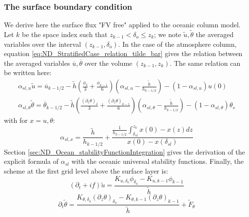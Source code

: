 \subsubsection{The surface boundary condition}
We derive here the surface flux "FV free" applied to the oceanic
column model. Let $k$ be the space index such that
$z_{k-1} < \delta_o \leq z_k$;
we note $\widetilde{u}, \widetilde{\theta}$
the averaged variables over the interval $(z_{k-1}, \delta_o)$.
In the case of the atmosphere column, equation
\eqref{eq:ND_StratifiedCase_relation_tilde_bar}
gives the relation between the averaged variables
$\overline{u}, \overline{\theta}$ over the volume $(z_{k-1}, z_{k})$.
The same relation can be written here:
\begin{equation}
\begin{aligned}
\label{eq:ND_Ocean_relation_tilde_bar}
\alpha_{sl, u}\widetilde{u} = \overline{u}_{k-1/2} -
\widetilde{h}
	\left(\frac{\phi_{\delta}}{3} + \frac{\phi_{k-1}}{6}\right)
	\left(\alpha_{sl, u} - \frac{\widetilde{h}}{h_{k-1/2}}\right)
	- (1 - \alpha_{sl, u})u(0)\\
\alpha_{sl, \theta}
\widetilde{\theta}
= \overline{\theta}_{k-1/2} -
	\widetilde{h}\left(\frac{{(\partial_z \theta)}_{\delta}}{3}
	+ \frac{{(\partial_z \theta)}_{k-1}}{6}\right)
	\left(\alpha_{sl, \theta}-\frac{\widetilde{h}}{h_{k-1/2}}\right)
 - (1 - \alpha_{sl, \theta})\theta_s
\end{aligned}
\end{equation}
with for $x = u, \theta$:
\begin{equation}
	\alpha_{sl, x} = \frac{\widetilde{h}}{h_{k-1/2}} +
	\frac{\frac{1}{{h_{k-1/2}}}\int_{\delta_{sl}}^{z_k} x(0) - x(z)
	dz}{x(0) - x(\delta_{sl})}
\end{equation}
Section \ref{sec:ND_Ocean_stabilityFunctionIntegration}
gives the derivation of the explicit formula of $\alpha_{sl}$
with the oceanic universal stability functions.
Finally, the scheme at the first grid level above
the surface layer is:
\begin{equation}
	\label{eq:ND_Ocean_semiDiscreteEkmanEqFVfree}
	(\partial_t+if) \widetilde{u}
	= \frac{K_{u, \delta_o}\phi_{\delta_o}
	- K_{u,k-1} \phi_{k-1}}{\widetilde{h}}
\end{equation}
\begin{equation}
	\label{eq:ND_Ocean_semiDiscreteEkmanEqPTFVfree}
	\partial_t \widetilde{\theta}
	= \frac{K_{\theta, \delta_o}{(\partial_z \theta)}_{\delta_o} -
	K_{\theta,k-1} {(\partial_z \theta)}_{k-1}}{\widetilde{h}}
	+ \widetilde{F}_\theta 
\end{equation}
